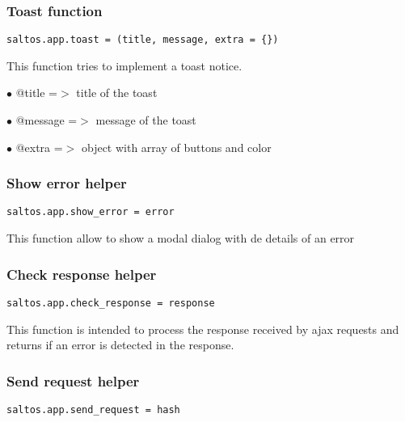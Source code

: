 \documentclass[a4paper]{article}
\begin{document}
\hypertarget{toc563}{}
\subsubsection{Toast function}

\begin{lstlisting}
saltos.app.toast = (title, message, extra = {})
\end{lstlisting}

This function tries to implement a toast notice.

\begin{compactitem}
\item[\color{myblue}$\bullet$] @title   =$>$ title of the toast
\item[\color{myblue}$\bullet$] @message =$>$ message of the toast
\item[\color{myblue}$\bullet$] @extra   =$>$ object with array of buttons and color
\end{compactitem}

\hypertarget{toc564}{}
\subsubsection{Show error helper}

\begin{lstlisting}
saltos.app.show_error = error
\end{lstlisting}

This function allow to show a modal dialog with de details of an error

\hypertarget{toc565}{}
\subsubsection{Check response helper}

\begin{lstlisting}
saltos.app.check_response = response
\end{lstlisting}

This function is intended to process the response received by ajax requests and returns
if an error is detected in the response.

\hypertarget{toc566}{}
\subsubsection{Send request helper}

\begin{lstlisting}
saltos.app.send_request = hash
\end{lstlisting}
\end{document}
